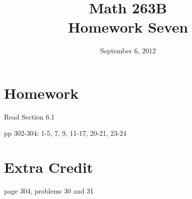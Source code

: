 \documentclass{exam}
\title{Math 263B \\ Homework Seven}
\date{September 6, 2012}
\begin{document}
\maketitle

\section{Homework}

\begin{itemize*}
  \item Read Section 6.1
  \item pp 302-304: 1-5, 7, 9, 11-17, 20-21, 23-24
\end{itemize*}


\section{Extra Credit}
page 304, problems 30 and 31
\end{document}

